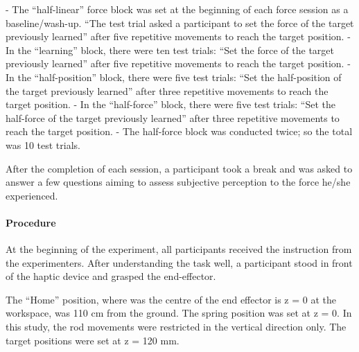 -	The “half-linear” force block was set at the beginning of each force session as a baseline/wash-up. “The test trial asked a participant to set the force of the target previously learned” after five repetitive movements to reach the target position.
-	In the “learning” block, there were ten test trials: “Set the force of the target previously learned” after five repetitive movements to reach the target position.
-	In the “half-position” block, there were five test trials: “Set the half-position of the target previously learned” after three repetitive movements to reach the target position.
-	In the “half-force” block, there were five test trials: “Set the half-force of the target previously learned” after three repetitive movements to reach the target position.
-	The half-force block was conducted twice; so the total was 10 test trials.

After the completion of each session, a participant took a break and was asked to answer a few questions aiming to assess subjective perception to the force he/she experienced.

\paragraph{Procedure}
At the beginning of the experiment, all participants received the instruction from the experimenters. After understanding the task well, a participant stood in front of the haptic device and grasped the end-effector.

The “Home” position, where was the centre of the end effector is z = 0 at the workspace, was 110 cm from the ground. The spring position was set at z = 0. In this study, the rod movements were restricted in the vertical direction only. The target positions were set at z = 120 mm.

